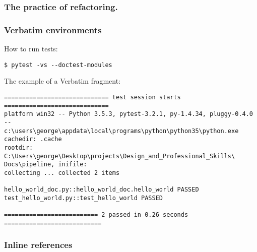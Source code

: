 \documentclass{beamer}
\begin{document}
\begin{frame}
\frametitle{The practice of refactoring.}
\end{frame}



\begin{frame}[fragile]
\frametitle{Verbatim environments} 

How to run tests:
\begin{verbatim}
$ pytest -vs --doctest-modules
\end{verbatim}

\vspace{5mm}  

The example of a Verbatim fragment:
\scriptsize %
\begin{verbatim}
============================= test session starts =============================
platform win32 -- Python 3.5.3, pytest-3.2.1, py-1.4.34, pluggy-0.4.0 -- 
c:\users\george\appdata\local\programs\python\python35\python.exe
cachedir: .cache
rootdir: C:\Users\george\Desktop\projects\Design_and_Professional_Skills\
Docs\pipeline, inifile:
collecting ... collected 2 items

hello_world_doc.py::hello_world_doc.hello_world PASSED
test_hello_world.py::test_hello_world PASSED

========================== 2 passed in 0.26 seconds ===========================
\end{verbatim}

\end{frame}

\begin{frame}
\frametitle{Inline references}


\end{frame}


\end{document}

